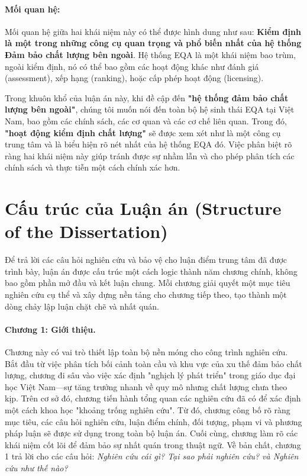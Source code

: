 \documentclass[12pt, a4paper, openany]{report}
\begin{document}
\paragraph{Mối quan hệ:}
Mối quan hệ giữa hai khái niệm này có thể được hình dung như sau: \textbf{Kiểm định là một trong những công cụ quan trọng và phổ biến nhất của hệ thống Đảm bảo chất lượng bên ngoài}. Hệ thống EQA là một khái niệm bao trùm, ngoài kiểm định, nó có thể bao gồm các hoạt động khác như đánh giá (assessment), xếp hạng (ranking), hoặc cấp phép hoạt động (licensing).

Trong khuôn khổ của luận án này, khi đề cập đến \textbf{"hệ thống đảm bảo chất lượng bên ngoài"}, chúng tôi muốn nói đến toàn bộ hệ sinh thái EQA tại Việt Nam, bao gồm các chính sách, các cơ quan và các cơ chế liên quan. Trong đó, \textbf{"hoạt động kiểm định chất lượng"} sẽ được xem xét như là một công cụ trung tâm và là biểu hiện rõ nét nhất của hệ thống EQA đó. Việc phân biệt rõ ràng hai khái niệm này giúp tránh được sự nhầm lẫn và cho phép phân tích các chính sách và thực tiễn một cách chính xác hơn.


\section{Cấu trúc của Luận án (Structure of the Dissertation)}
\label{sec:cau_truc_luan_an}

Để trả lời các câu hỏi nghiên cứu và bảo vệ cho luận điểm trung tâm đã được trình bày, luận án được cấu trúc một cách logic thành năm chương chính, không bao gồm phần mở đầu và kết luận chung. Mỗi chương giải quyết một mục tiêu nghiên cứu cụ thể và xây dựng nền tảng cho chương tiếp theo, tạo thành một dòng chảy lập luận chặt chẽ và nhất quán.

\paragraph{Chương 1: Giới thiệu.}
Chương này có vai trò thiết lập toàn bộ nền móng cho công trình nghiên cứu. Bắt đầu từ việc phân tích bối cảnh toàn cầu và khu vực của xu thế đảm bảo chất lượng, chương đi sâu vào việc xác định "nghịch lý phát triển" trong giáo dục đại học Việt Nam—sự tăng trưởng nhanh về quy mô nhưng chất lượng chưa theo kịp. Trên cơ sở đó, chương tiến hành tổng quan các nghiên cứu đã có để xác định một cách khoa học "khoảng trống nghiên cứu". Từ đó, chương công bố rõ ràng mục tiêu, các câu hỏi nghiên cứu, luận điểm chính, đối tượng, phạm vi và phương pháp luận sẽ được sử dụng trong toàn bộ luận án. Cuối cùng, chương làm rõ các khái niệm cốt lõi để đảm bảo sự nhất quán trong thuật ngữ. Về bản chất, chương 1 trả lời cho các câu hỏi: \textit{Nghiên cứu cái gì? Tại sao phải nghiên cứu? và Nghiên cứu như thế nào?}
\end{document}
